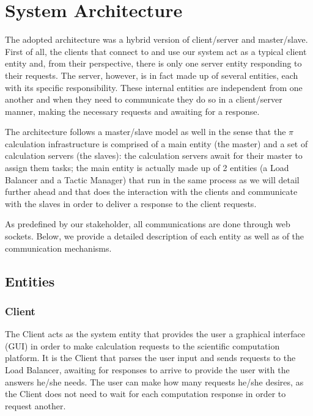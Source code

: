 \documentclass[12pt]{article}
\begin{document}
\newpage
\section{System Architecture} \label{architecture} %

The adopted architecture was a hybrid version of client/server and master/slave.
First of all, the clients that connect to and use our system act as a typical client entity and, from their perspective, there is only one server entity 
responding to their requests.
The server, however, is in fact made up of several entities, each with its specific responsibility.
These internal entities are independent from one another and when they need to communicate they do so in a client/server manner, making the necessary requests 
and awaiting for a response.

The architecture follows a master/slave model as well in the sense that the $\pi$ calculation infrastructure is comprised of a main entity (the master) and a 
set of calculation servers (the slaves): the calculation servers await for their master to assign them tasks; the main entity is actually made up of 2 
entities (a Load Balancer and a Tactic Manager) that run in the same process as we will detail further ahead and that does the interaction with the clients and 
communicate with the slaves in order to deliver a response to the client requests.

As predefined by our stakeholder, all communications are done through web sockets.
Below, we provide a detailed description of each entity as well as of the communication mechanisms.

\subsection{Entities} \label{entities} %

\subsubsection{Client}

The Client acts as the system entity that provides the user a graphical interface (GUI) in order to make calculation requests to the scientific computation 
platform.
It is the Client that parses the user input and sends requests to the Load Balancer, awaiting for responses to arrive to provide the user with the answers he/she needs.
The user can make how many requests he/she desires, as the Client does not need to wait for each computation response in order to request another.
\end{document}
